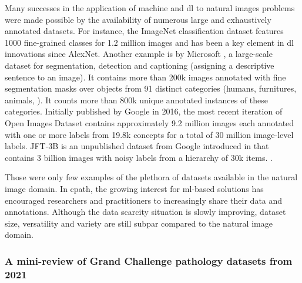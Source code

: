 Many successes in the application of machine and \acrlong{dl} to natural images problems were made possible by the availability of numerous large and exhaustively annotated datasets. For instance, the ImageNet classification dataset features 1000 fine-grained classes for 1.2 million images and has been a key element in \acrlong{dl} innovations since AlexNet. Another example is  by Microsoft \parencite{lin2014microsoft}, a large-scale dataset for segmentation, detection and captioning (\ie assigning a descriptive sentence to an image). It contains more than 200k images annotated with fine segmentation masks over objects from 91 distinct categories (\ie humans, furnitures, animals, \etc). It counts more than 800k unique annotated instances of these categories. Initially published by Google in 2016, the most recent iteration of Open Images Dataset \parencite{kuznetsova2020open} contains approximately 9.2 million images each annotated with one or more labels from 19.8k concepts for a total of 30 million image-level labels. JFT-3B is an unpublished dataset from Google introduced in \parencite{zhai2106scaling} that contains 3 billion images with noisy labels from a hierarchy of 30k items. . 

Those were only few examples of the plethora of datasets available in the natural image domain. In \acrlong{cpath}, the growing interest for \acrshort{ml}-based solutions has encouraged researchers and practitioners to increasingly share their data and annotations. Although the data scarcity situation is slowly improving, dataset size, versatility and variety are still subpar compared to the natural image domain.

\subsubsection{A mini-review of Grand Challenge pathology datasets from 2021}
\label{sssec:backdp:grandchallenge}

